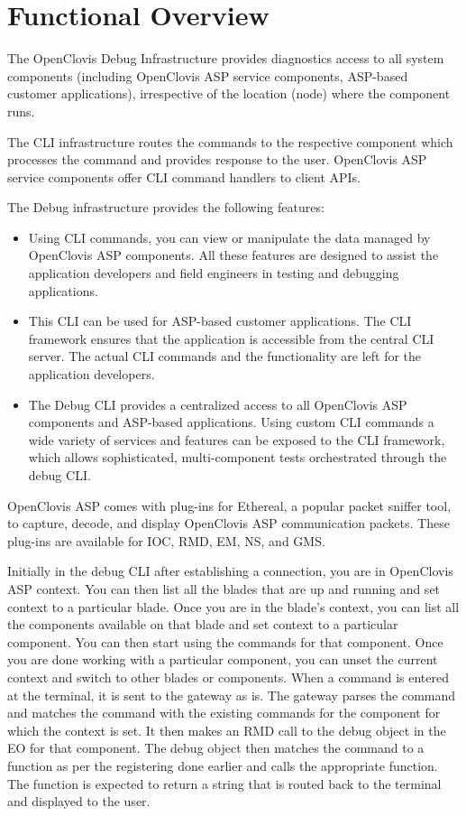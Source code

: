 \hypertarget{group__group16}{
\chapter{Functional Overview}
\label{group__group26}
}


The OpenClovis Debug Infrastructure provides diagnostics access to all system components (including OpenClovis ASP service components, 
ASP-based customer applications), irrespective of the location (node) where the component runs.

The CLI infrastructure routes the commands to the respective component which processes the command and provides response to the user. OpenClovis ASP 
service components offer CLI command handlers to client APIs.

The Debug infrastructure provides the following features: \begin{itemize}
\item Using CLI commands, you can view or manipulate the data managed by OpenClovis ASP components. All these features are designed to assist the application developers and field engineers in testing and debugging applications. \item This CLI can be used for ASP-based customer applications. The CLI framework ensures that the application is accessible from the central CLI server. The actual CLI commands and the functionality are left for the application developers. \item The Debug CLI provides a centralized access to all OpenClovis ASP components and ASP-based applications. Using custom CLI commands a wide variety of services and features can be exposed to the CLI framework, which allows sophisticated, multi-component tests orchestrated through the debug CLI.\end{itemize}
OpenClovis ASP comes with plug-ins for Ethereal, a popular packet sniffer tool, to capture, decode, and display OpenClovis ASP communication packets. These plug-ins are available for IOC, RMD, EM, NS, and GMS.


Initially in the debug CLI after establishing a connection, you are in OpenClovis ASP context. You can then list all the blades that are up and 
running and set context to a particular blade. Once you are in the blade's context, you can list all the components available on that blade and set
context to a particular component. You can then start using the commands for that component. Once you are done working with a particular component, you 
can unset the current context and switch to other blades or components. When a command is entered at the terminal, it is sent to the gateway as is. The 
gateway parses the command and matches the command with the existing commands for the component for which the context is set. It then makes an RMD call 
to the debug object in the EO for that component. The debug object then matches the command to a function as per the registering done earlier and calls 
the appropriate function. The function is expected to return a string that is routed back to the terminal and displayed to the user. 




